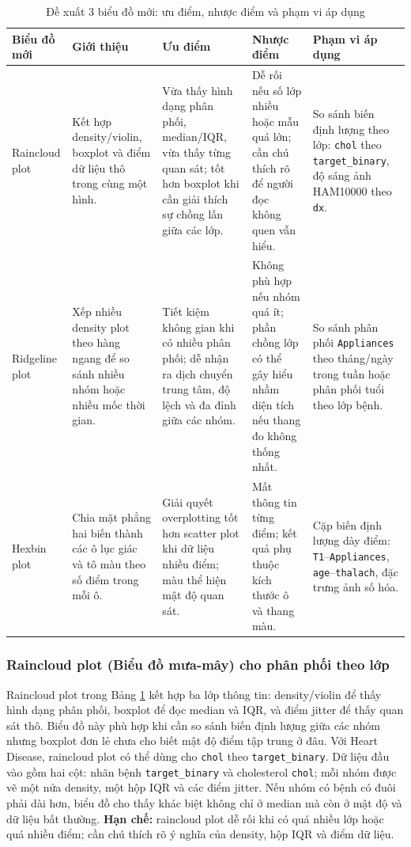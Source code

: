 \begin{table}[H]
\centering
\caption{Đề xuất 3 biểu đồ mới: ưu điểm, nhược điểm và phạm vi áp dụng}
\label{tab:chapter1_extra_chart_types}
\small
\begin{tabular}{p{}p{}p{}p{}p{}}
\toprule
Biểu đồ mới & Giới thiệu & Ưu điểm & Nhược điểm & Phạm vi áp dụng \\
\midrule
Raincloud plot & Kết hợp density/violin, boxplot và điểm dữ liệu thô trong cùng một hình. & Vừa thấy hình dạng phân phối, median/IQR, vừa thấy từng quan sát; tốt hơn boxplot khi cần giải thích sự chồng lấn giữa các lớp. & Dễ rối nếu số lớp nhiều hoặc mẫu quá lớn; cần chú thích rõ để người đọc không quen vẫn hiểu. & So sánh biến định lượng theo lớp: \texttt{chol} theo \texttt{target\_binary}, độ sáng ảnh HAM10000 theo \texttt{dx}. \\
Ridgeline plot & Xếp nhiều density plot theo hàng ngang để so sánh nhiều nhóm hoặc nhiều mốc thời gian. & Tiết kiệm không gian khi có nhiều phân phối; dễ nhận ra dịch chuyển trung tâm, độ lệch và đa đỉnh giữa các nhóm. & Không phù hợp nếu nhóm quá ít; phần chồng lớp có thể gây hiểu nhầm diện tích nếu thang đo không thống nhất. & So sánh phân phối \texttt{Appliances} theo tháng/ngày trong tuần hoặc phân phối tuổi theo lớp bệnh. \\
Hexbin plot & Chia mặt phẳng hai biến thành các ô lục giác và tô màu theo số điểm trong mỗi ô. & Giải quyết overplotting tốt hơn scatter plot khi dữ liệu nhiều điểm; màu thể hiện mật độ quan sát. & Mất thông tin từng điểm; kết quả phụ thuộc kích thước ô và thang màu. & Cặp biến định lượng dày điểm: \texttt{T1}--\texttt{Appliances}, \texttt{age}--\texttt{thalach}, đặc trưng ảnh số hóa. \\
\bottomrule
\end{tabular}
\end{table}

\subsubsection{Raincloud plot (Biểu đồ mưa-mây) cho phân phối theo lớp}

Raincloud plot trong Bảng \ref{tab:chapter1_extra_chart_types} kết hợp ba lớp thông tin: density/violin để thấy hình dạng phân phối, boxplot để đọc median và IQR, và điểm jitter để thấy quan sát thô. Biểu đồ này phù hợp khi cần so sánh biến định lượng giữa các nhóm nhưng boxplot đơn lẻ chưa cho biết mật độ điểm tập trung ở đâu. Với Heart Disease, raincloud plot có thể dùng cho \texttt{chol} theo \texttt{target\_binary}. Dữ liệu đầu vào gồm hai cột: nhãn bệnh \texttt{target\_binary} và cholesterol \texttt{chol}; mỗi nhóm được vẽ một nửa density, một hộp IQR và các điểm jitter. Nếu nhóm có bệnh có đuôi phải dài hơn, biểu đồ cho thấy khác biệt không chỉ ở median mà còn ở mật độ và dữ liệu bất thường. \textbf{Hạn chế:} raincloud plot dễ rối khi có quá nhiều lớp hoặc quá nhiều điểm; cần chú thích rõ ý nghĩa của density, hộp IQR và điểm dữ liệu.


